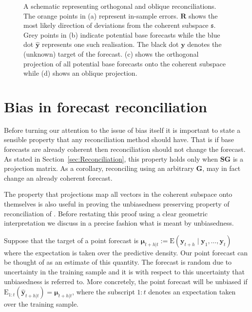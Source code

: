 \documentclass[12pt]{article}
\def\E{\text{E}}
\theoremstyle{definition}
\begin{document}
\begin{figure}[H]
\begin{subfigure}[!h]{0.48\textwidth}
        \caption{}
    \end{subfigure}
    \caption{A schematic representing orthogonal and oblique reconciliations.  The orange points in (a) represent in-sample errors. $\bm{R}$ shows the most likely direction of deviations from the coherent subspace $\mathfrak{s}$. Grey points in (b) indicate  potential base forecasts while the blue dot ${\hat{\bm y}}$ represents one such realisation. The black dot ${\bm y}$ denotes the (unknown) target of the forecast. (c) shows the orthogonal projection of all potential base forecasts onto the coherent subspace while (d) shows an oblique projection.} \label{fig:OthogonalVSOblique_projection}
\end{figure}

	

	
	\section{Bias in forecast reconciliation}\label{sec:BiasInRecon}
	
	Before turning our attention to the issue of bias itself it is important to state a sensible property that any reconciliation method should have.  That is if base forecasts are already coherent then reconciliation should not change the forecast.  As stated in Section~\ref{sec:Reconciliation}, this property holds only when $\bm{SG}$ is a projection matrix.  As a corollary, reconciling using an arbitrary $\bm{G}$,  may in fact change an already coherent forecast.
	
	The property that projections map all vectors in the coherent subspace onto themselves is also useful in proving the unbiasedness preserving property of reconciliation of \cite{WicEtAl2019}.  Before restating this proof using a  clear geometric interpretation we discuss in a precise fashion what is meant by unbiasedness.
	
	Suppose that the target of a point forecast is $\bm{\mu}_{t+h|t}:=\E(\bm{y}_{t+h}\mid\bm{y}_{1},\dots,\bm{y}_{t})$ where the expectation is taken over the predictive density.  Our point forecast can be thought of as an estimate of this quantity. The forecast is random due to uncertainty in the training sample and it is with respect to this uncertainty that unbiasedness is referred to.  More concretely, the point forecast will be unbiased if $\E_{1:t}(\hat{\bm{y}}_{t+h|t})=\bm{\mu}_{t+h|t}$, where the subscript $1:t$ denotes an expectation taken over the training sample.
	
\end{document}
